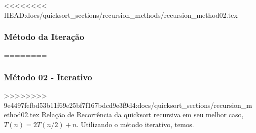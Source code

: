 <<<<<<<< HEAD:docs/quicksort_sections/recursion_methods/recursion_method02.tex
\subsubsection{Método da Iteração}
========
\subsubsection{Método 02 - Iterativo}
>>>>>>>> 9e4497fefbd53b11f69e25bf7f167bdcd9e3f9d4:docs/quicksort_sections/recursion_method02.tex
Relação de Recorrência da quicksort recursiva em seu melhor caso, $T(n) = 2T(n/2) + n$. Utilizando o método iterativo, temos.
